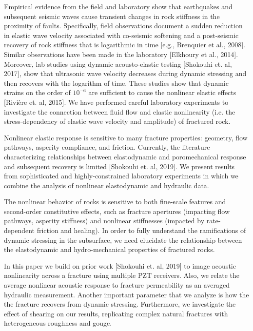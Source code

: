 \documentclass[draft]{agujournal2019}
\begin{document}
Empirical evidence from the field and laboratory show that earthquakes and subsequent seismic waves cause transient changes in rock stiffness in the proximity of faults. Specifically, field observations document a sudden reduction in elastic wave velocity associated with co-seismic softening and a post-seismic recovery of rock stiffness that is logarithmic in time [e.g., Brenquier et al., 2008]. Similar observations have been made in the laboratory [Elkhoury et al., 2014]. Moreover, lab studies using dynamic acousto-elastic testing [Shokouhi et. al, 2017], show that ultrasonic wave velocity decreases during dynamic stressing and then recovers with the logarithm of time. These studies show that dynamic strains on the order of $10^{-6}$ are sufficient to cause the nonlinear elastic effects [Rivi\`{e}re et. al, 2015]. We have performed careful laboratory experiments to investigate the connection between fluid flow and elastic nonlinearity (i.e. the stress-dependency of elastic wave velocity and amplitude) of fractured rock.

Nonlinear elastic response is sensitive to many fracture properties: geometry, flow pathways, asperity compliance, and friction. Currently, the literature characterizing relationships between elastodynamic and poromechanical response and subsequent recovery is limited [Shokouhi et. al, 2019]. We present results from sophisticated and highly-constrained  laboratory experiments in which we combine the analysis of nonlinear elastodynamic and hydraulic data.

The nonlinear behavior of rocks is sensitive to both fine-scale features and second-order constitutive effects, such as fracture apertures (impacting flow pathways, asperity stiffness) and nonlinear stiffnesses (impacted by rate-dependent friction and healing). In order to fully understand the ramifications of dynamic stressing in the subsurface, we need elucidate the relationship between the elastodynamic and hydro-mechanical properties of fractured rocks.

In this paper we build on prior work [Shokouhi et. al, 2019] to image acoustic nonlinearity across a fracture using multiple PZT receivers. Also, we relate the average nonlinear acoustic response to fracture permeability as an averaged hydraulic measurement. Another important parameter that we analyze is how the the fracture recovers from dynamic stressing. Furthermore, we investigate the effect of shearing on our results, replicating complex natural fractures with heterogeneous roughness and gouge.    
\end{document}
